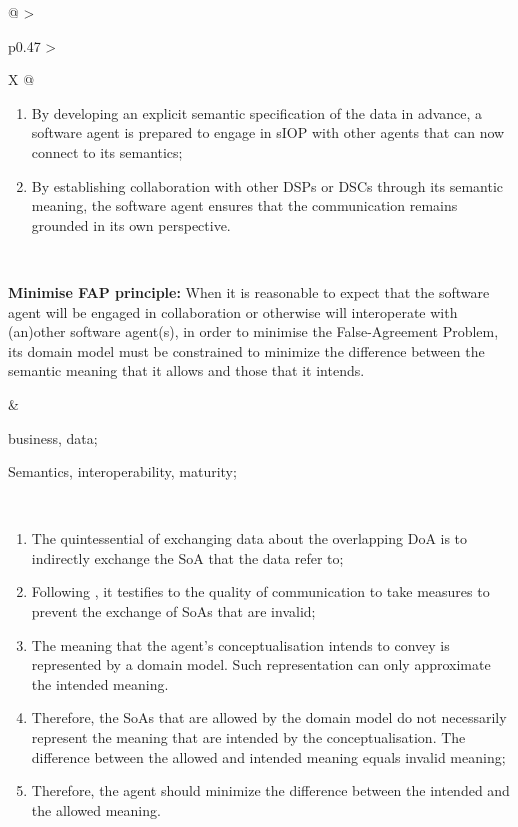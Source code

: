 \begin{xltabular}[l]{\linewidth}{@{} >{\small\raggedright\arraybackslash}p{0.47\linewidth} >{\small\raggedright\arraybackslash}X @{}}
\begin{enumerate}[left=10pt, nosep]
  \item By developing an explicit semantic specification of the data in advance, a software agent is prepared to engage in sIOP with other agents that can now connect to its semantics;
  \item By establishing collaboration with other DSPs or DSCs through its semantic meaning, the software agent ensures that the communication remains grounded in its own perspective.
\end{enumerate} \\
%
%
%
\begin{mmdp}\label{dp:mfapp}{\bfseries Minimise FAP principle:}
\quad When it is reasonable to expect that the software agent will be engaged in collaboration or otherwise will interoperate with (an)other software agent(s), in order to minimise the False-Agreement Problem, its domain model must be constrained to minimize the difference between the semantic meaning that it allows and those that it intends.
\end{mmdp}
&
\begin{description}[labelwidth=3.7cm,leftmargin=3.7cm+1ex,nosep,topsep=2ex,labelsep=1ex,font=\bfseries]
  \item[Type of information:] business, data;
  \item[Quality attributes:] Semantics, interoperability, maturity;
\end{description} \\
\begin{enumerate}[left=6pt, nosep]
  \item The quintessential of exchanging data about the overlapping DoA is to indirectly exchange the SoA that the data refer to;
  \item Following \cite{Grice:1991BT}, it testifies to the quality of communication to take measures to prevent the exchange of SoAs that are invalid;
  \item The meaning that the agent's conceptualisation intends to convey is represented by a domain model. Such representation can only approximate the intended meaning. 
  \item Therefore, the SoAs that are allowed by the domain model do not necessarily represent the meaning that are intended by the conceptualisation. The difference between the allowed and intended meaning equals invalid meaning;
  \item Therefore, the agent should minimize the difference between the intended and the allowed meaning.

\end{enumerate}
\end{xltabular}
